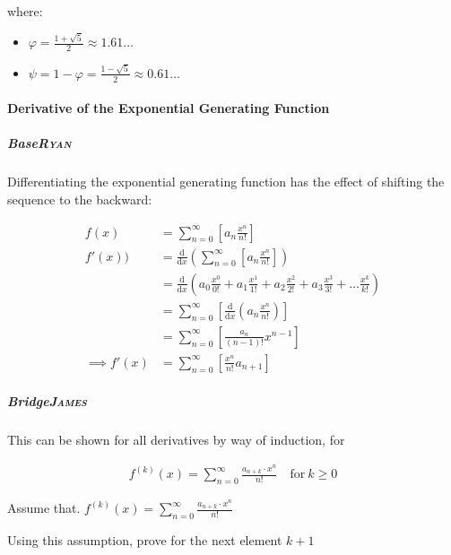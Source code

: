 \documentclass[11pt]{article}
\begin{document}
where:

\begin{itemize}
\item \(\varphi = \frac{1+ \sqrt{5} }{2} \approx 1.61\ldots\)
\item \(\psi = 1-\varphi = \frac{1- \sqrt{5} }{2} \approx 0.61\ldots\)
\end{itemize}

\paragraph{Derivative of the Exponential Generating Function}
\label{Derivative-exp-gen-function}
\subparagraph{Base\hfill{}\textsc{Ryan}}
\label{sec:org18e9e28}
Differentiating the exponential generating function has the effect of shifting the sequence to the backward: \cite{lehmanReadingsMathematicsComputer2010}

\begin{align}
    f\left( x \right) &= \sum^{\infty}_{n= 0}   \left[ a_n \frac{x^n}{n!} \right] \label{eq:exp-pow-series} \\
f'\left( x \right)) &= \frac{\mathrm{d} }{\mathrm{d} x}\left( \sum^{\infty}_{n= 0}   \left[ a_n \frac{x^n}{n!} \right]  \right) \nonumber \\
&= \frac{\mathrm{d}}{\mathrm{d} x} \left( a_0 \frac{x^0}{0!} +  a_1 \frac{x^1}{1!} +  a_2 \frac{x^2}{2!}+  a_3 \frac{x^3}{3! } +  \ldots \frac{x^k}{k!} \right) \nonumber \\
&= \sum^{\infty}_{n= 0}   \left[ \frac{\mathrm{d} }{\mathrm{d} x}\left( a_n \frac{x^n}{n!} \right) \right] \nonumber \\
&= \sum^{\infty}_{n= 0}   {\left[{ \frac{a_n}{{\left({ n- 1 }\right)!}} } x^{n- 1}  \right]} \nonumber \\
\implies f'(x) &= \sum^{\infty}_{n= 0}   {\left[{ \frac{x^n}{n!}a_{n+  1} }\right]} \label{eq:exp-pow-series-sol}
\end{align}

\subparagraph{Bridge\hfill{}\textsc{James}}
\label{sec:org97895bc}
This can be shown for all derivatives by way of induction, for

\begin{align}
f^{(k)}\left(x\right) = \sum_{n=0}^\infty\frac{a_{n+k}\cdot x^n}{n!} \quad \text{for}~k \ge 0
\end{align}

Assume that. \(f^{(k)}\left(x\right) = \sum_{n=0}^\infty\frac{a_{n+k}\cdot x^n}{n!}\)

Using this assumption, prove for the next element \(k+1\)
\end{document}

